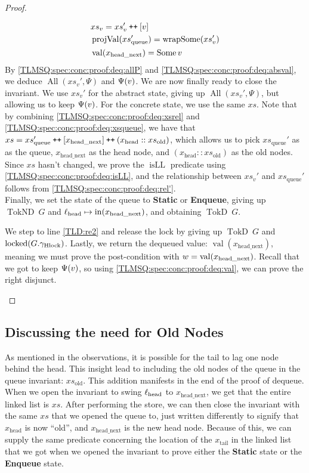 \documentclass[a4paper, 10pt]{report}
\theoremstyle{definition}
\newcommand{\locked}{\operatorname{locked}}
\newcommand{\xsc}{xs}
\newcommand{\xsqueue}{xs_{\mathrm{queue}}}
\newcommand{\xsold}{xs_{\mathrm{old}}}
\newcommand{\isLL}{\operatorname{isLL}}
\newcommand{\AllP}{\operatorname{All}}
\newcommand{\projval}{\operatorname{projVal}}
\newcommand{\wrapsome}{\operatorname{wrapSome}}
\newcommand{\locN}[1]{\loc_{\mathrm{#1}}}
\newcommand{\lochead}{\locN{head}}
\newcommand{\nodeval}{\valB}
\newcommand{\nIn}[1]{\operatorname{in}(#1)}
\newcommand{\nVal}[1]{\operatorname{val}(#1)}
\newcommand{\node}{x}
\newcommand{\nodeN}[1]{\node_{\mathrm{#1}}}
\newcommand{\nodehead}{\nodeN{head}}
\newcommand{\nodetail}{\nodeN{tail}}
\newcommand{\nodeheadnext}{\nodeN{head\_next}}
\newcommand{\absvalue}{\val}
\newcommand{\absvalueList}{xs_v}
\newcommand{\StaticState}{\textbf{Static}\xspace}
\newcommand{\EnqueueState}{\textbf{Enqueue}\xspace}
\newcommand{\Qg}{G}
\newcommand{\ghlock}{\gname_{\mathrm{Hlock}}}
\newcommand{\TokD}[1]{\operatorname{TokD} ~ #1}
\newcommand{\TokDQg}{\TokD{\Qg}}
\newcommand{\TokND}[1]{\operatorname{TokND} ~ #1}
\newcommand{\TokNDQg}{\TokND{\Qg}}
\newcommand\catenate{\mathbin{\text{\ttfamily\upshape ++}}}
\begin{document}
\begin{proof}
\begin{itemize}
  \begin{align}
    &\absvalueList = \absvalueList' \catenate [\absvalue]\label{TLMSQ:spec:conc:proof:deq:absval}\\
    &\projval(\xsqueue') = \wrapsome(\absvalueList')\label{TLMSQ:spec:conc:proof:deq:rel'}\\
    &\nVal{\nodeheadnext} = \Some{\absvalue}\label{TLMSQ:spec:conc:proof:deq:val}
  \end{align}
  By \ref{TLMSQ:spec:conc:proof:deq:allP} and \ref{TLMSQ:spec:conc:proof:deq:absval}, we deduce $\AllP(\absvalueList', \Psi)$ and $\Psi(\absvalue)$. We are now finally ready to close the invariant. We use $\absvalueList'$ for the abstract state, giving up $\AllP(\absvalueList', \Psi)$, but allowing us to keep $\Psi(\absvalue)$. For the concrete state, we use the same $\xsc$. Note that by combining \ref{TLMSQ:spec:conc:proof:deq:xsrel} and \ref{TLMSQ:spec:conc:proof:deq:xsqueue}, we have that $\xsc = \xsqueue' \catenate [\nodeheadnext] \catenate (\nodehead :: \xsold)$, which allows us to pick $\xsqueue'$ as as the queue, $\nodeheadnext$ as the head node, and $(\nodehead :: \xsold)$ as the old nodes. Since $\xsc$ hasn't changed, we prove the $\isLL$ predicate using \ref{TLMSQ:spec:conc:proof:deq:isLL}, and the relationship between $\absvalueList'$ and $\xsqueue'$ follows from \ref{TLMSQ:spec:conc:proof:deq:rel'}.\\
  Finally, we set the state of the queue to \StaticState or \EnqueueState, giving up $\TokNDQg$ and $\lochead \mapsto \nIn{\nodeheadnext}$, and obtaining $\TokDQg$.

  We step to line \ref{TLD:re2} and release the lock by giving up $\TokDQg$ and $\locked(\Qg.\ghlock)$. Lastly, we return the dequeued value: $\nVal{\nodeheadnext}$, meaning we must prove the post-condition with $\nodeval = \nVal{\nodeheadnext}$. Recall that we got to keep $\Psi(\absvalue)$, so using \ref{TLMSQ:spec:conc:proof:deq:val}, we can prove the right disjunct.
\end{itemize}
\end{proof}

\subsection{Discussing the need for Old Nodes}\label{TLMSQ:Discussion:xs_old}

As mentioned in the observations, it is possible for the tail to lag one node behind the head. This insight lead to including the old nodes of the queue in the queue invariant: $\xsold$. This addition manifests in the end of the proof of dequeue. When we open the invariant to swing $\lochead$ to $\nodeheadnext$, we get that the entire linked list is $\xsc$. After performing the store, we can then close the invariant with the same $\xsc$ that we opened the queue to, just written differently to signify that $\nodehead$ is now ``old'', and $\nodeheadnext$ is the new head node. Because of this, we can supply the same predicate concerning the location of the $\nodetail$ in the linked list that we got when we opened the invariant to prove either the \StaticState state or the \EnqueueState state.
\end{document}
